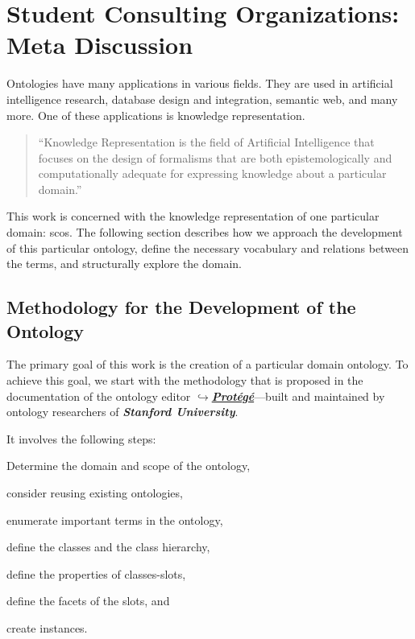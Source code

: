 \documentclass[a4paper, DIV=13, BCOR=0cm]{scrbook}
\newcommand{\pn}[1]{\textit{\textbf{#1}}}
\newcommand{\link}[2]{\href{#1}{$\hookrightarrow$#2}}
\begin{document}
\chapter{Student Consulting Organizations: Meta Discussion }
Ontologies have many applications in various fields. They are used in artificial intelligence research, database design and integration, semantic web, and many more. \cite[p.\,1]{Gomez-Perez:2004aa} One of these applications is knowledge representation.

\begin{quote}
	\enquote{Knowledge Representation is the field of Artificial Intelligence that focuses on the design of formalisms that are both epistemologically and computationally adequate for expressing knowledge about a particular domain.} \cite[p.\,XV, Preface]{baader2017introduction}
\end{quote}

This work is concerned with the knowledge representation of one particular domain: \glspl{sco}. The following section describes how we approach the development of this particular ontology, define the necessary vocabulary and relations between the terms, and structurally explore the domain.

\section{Methodology for the Development of the Ontology }

The primary goal of this work is the creation of a particular domain ontology. To achieve this goal, we start with the methodology that is proposed in the documentation \cite{guide-to-ontology} of the ontology editor \link{https://protege.stanford.edu}{\pn{Protégé}}---built and maintained by ontology researchers of \pn{Stanford University}. \cite{musen2015protege}

It involves the following steps:
\begin{compactenum}[(1)]
	\item Determine the domain and scope of the ontology,
	\item consider reusing existing ontologies,
	\item enumerate important terms in the ontology,
	\item define the classes and the class hierarchy,
	\item define the properties of classes-slots,
	\item define the facets of the slots, and
	\item create instances.
\end{compactenum}
\end{document}
